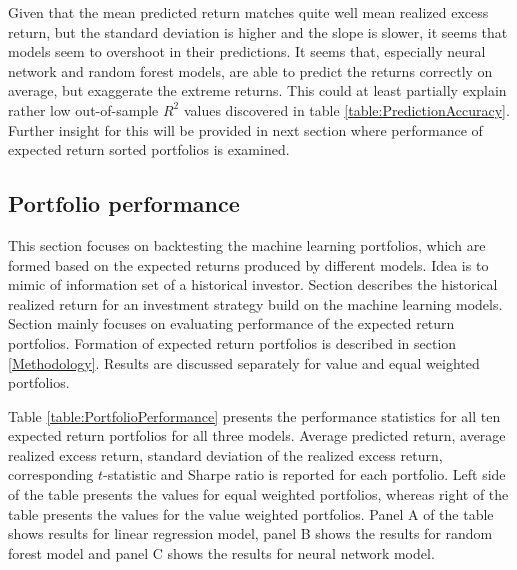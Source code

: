 \documentclass{article}
\begin{document}
Given that the mean predicted return matches quite well mean realized excess return, but the standard deviation is higher and the slope is slower, it seems that models seem to overshoot in their predictions. It seems that, especially neural network and random forest models, are able to predict the returns correctly on average, but exaggerate the extreme returns. This could at least partially explain rather low out-of-sample $R^2$ values discovered in table \ref{table:PredictionAccuracy}. Further insight for this will be provided in next section where performance of expected return sorted portfolios is examined.

\subsection{Portfolio performance}\label{Portfolio performance}

This section focuses on backtesting the machine learning portfolios, which are formed based on the expected returns produced by different models. Idea is to mimic of information set of a historical investor. Section describes the historical realized return for an investment strategy build on the machine learning models. Section mainly focuses on evaluating performance of the expected return portfolios. Formation of expected return portfolios is described in section \ref{Methodology}. Results are discussed separately for value and equal weighted portfolios. 

Table \ref{table:PortfolioPerformance} presents the performance statistics for all ten expected return portfolios for all three models. Average predicted return, average realized excess return, standard deviation of the realized excess return, corresponding $t$-statistic and Sharpe ratio is reported for each portfolio. Left side of the table presents the values for equal weighted portfolios, whereas right of the table presents the values for the value weighted portfolios. Panel A of the table shows results for linear regression model, panel B shows the results for random forest model and panel C shows the results for neural network model. 
\end{document}
